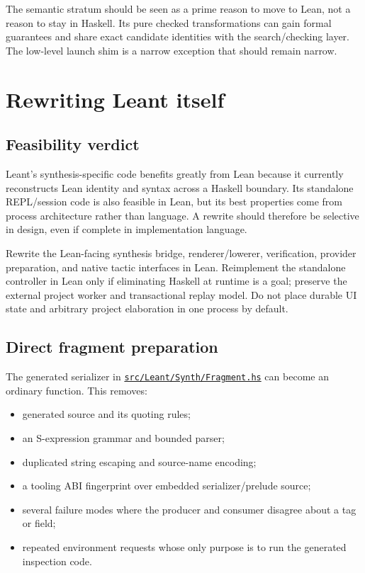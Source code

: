 \documentclass[10pt,letterpaper,oneside]{report}
\newcommand{\code}[1]{\texttt{\detokenize{#1}}}
\def\LeantBase{https://github.com/VladimirReshetnikov/Leant/blob/89663ab01d24f61bc017b8c8b1f52c35573082e4/}
\newcommand{\lpath}[1]{\href{\LeantBase#1}{\nolinkurl{#1}}}
\begin{document}
\begin{summarybox}
The semantic stratum should be seen as a prime reason to move to Lean, not a reason to stay in Haskell. Its pure checked transformations can gain formal guarantees and share exact candidate identities with the search/checking layer. The low-level launch shim is a narrow exception that should remain narrow.
\end{summarybox}

\chapter{Rewriting Leant itself}\label{ch:leant}

\section{Feasibility verdict}

Leant's synthesis-specific code benefits greatly from Lean because it currently reconstructs Lean identity and syntax across a Haskell boundary. Its standalone REPL/session code is also feasible in Lean, but its best properties come from process architecture rather than language. A rewrite should therefore be selective in design, even if complete in implementation language.

\begin{verdictbox}[title={Leant verdict}]
Rewrite the Lean-facing synthesis bridge, renderer/lowerer, verification, provider preparation, and native tactic interfaces in Lean. Reimplement the standalone controller in Lean only if eliminating Haskell at runtime is a goal; preserve the external project worker and transactional replay model. Do not place durable UI state and arbitrary project elaboration in one process by default.
\end{verdictbox}

\section{Direct fragment preparation}

The generated serializer in \lpath{src/Leant/Synth/Fragment.hs} can become an ordinary \code{MetaM} function. This removes:

\begin{itemize}
  \item generated \code{run_tac} source and its quoting rules;
  \item an S-expression grammar and bounded parser;
  \item duplicated string escaping and source-name encoding;
  \item a tooling ABI fingerprint over embedded serializer/prelude source;
  \item several failure modes where the producer and consumer disagree about a tag or field;
  \item repeated environment requests whose only purpose is to run the generated inspection code.
\end{itemize}
\end{document}
